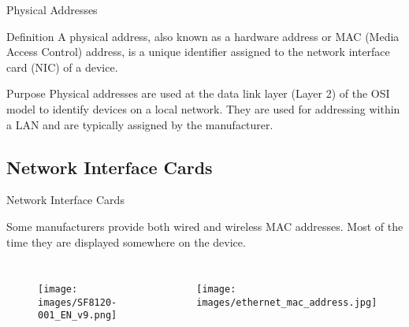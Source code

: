 \documentclass[10pt, aspectratio=43]{beamer}
\begin{document}
\begin{frame}{Physical Addresses}

    \begin{block}{Definition}
         A physical address, also known as a hardware address or MAC (Media Access Control) address, is a unique identifier assigned to the network interface card (NIC) of a device.
    \end{block}



    \begin{block}{Purpose}
        Physical addresses are used at the data link layer (Layer 2) of the OSI model to identify devices on a local network. They are used for addressing within a LAN and are typically assigned by the manufacturer.
    \end{block}
    
\end{frame}


\subsection{Network Interface Cards}
\begin{frame}{Network Interface Cards}

\begin{block}{}
    Some manufacturers provide both wired and wireless MAC addresses. Most of the time they are displayed somewhere on the device.
\end{block}

\begin{columns}
    
    \begin{figure}[h] %
    \centering
    \texttt{[image: images/SF8120-001\_EN\_v9.png]}
\end{figure}
\FloatBarrier

    \begin{figure}[h] %
    \centering
    \texttt{[image: images/ethernet\_mac\_address.jpg]}
\end{figure}
\FloatBarrier

\end{columns}
\end{frame}
\end{document}
